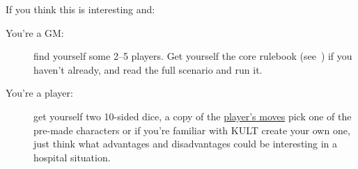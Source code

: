 If you think this is interesting and:
\begin{description}
  \item[You're a GM:] find yourself some 2--5 players. Get yourself the core rulebook (see~\cite{KULT:core})
    if you haven't already, and read the full scenario and run it.
  \item[You're a player:] get yourself two 10-sided dice, a copy of the
    \href{https://kultdivinitylost.com/wp-content/uploads/2018/08/KULT-Divinity-Lost-Reference-Sheet-Player-Moves.pdf}%
    {player's moves} pick one of the pre-made characters or if you're familiar with KULT create
    your own one, just think what advantages and disadvantages could be interesting in a hospital
    situation.
\end{description}

\clearpage %
\section*{} %
\hypersetup{linkcolor=KULTblack}
\setcounter{tocdepth}{2} %
\tableofcontents
\hypersetup{linkcolor=KULTblue}
\clearpage %
